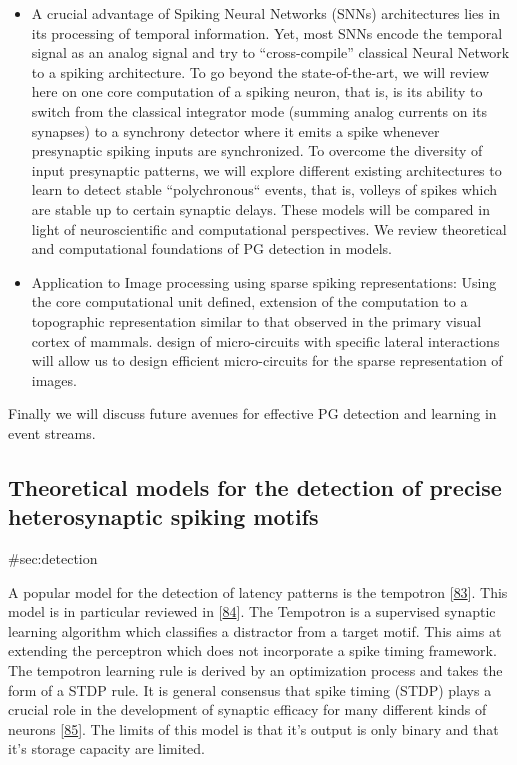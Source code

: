 \begin{itemize}
\item
  A crucial advantage of Spiking Neural Networks (SNNs) architectures lies in its processing of temporal information. Yet, most SNNs encode the temporal signal as an analog signal and try to ``cross-compile'' classical Neural Network to a spiking architecture. To go beyond the state-of-the-art, we will review here on one core computation of a spiking neuron, that is, is its ability to switch from the classical integrator mode (summing analog currents on its synapses) to a synchrony detector where it emits a spike whenever presynaptic spiking inputs are synchronized. To overcome the diversity of input presynaptic patterns, we will explore different existing architectures to learn to detect stable ``polychronous`` events, that is, volleys of spikes which are stable up to certain synaptic delays. These models will be compared in light of neuroscientific and computational perspectives. We review theoretical and computational foundations of PG detection in models.
\item
  Application to Image processing using sparse spiking representations: Using the core computational unit defined, extension of the computation to a topographic representation similar to that observed in the primary visual cortex of mammals. design of micro-circuits with specific lateral interactions will allow us to design efficient micro-circuits for the sparse representation of images.
\end{itemize}

Finally we will discuss future avenues for effective PG detection and learning in event streams.

\hypertarget{theoretical-models-for-the-detection-of-precise-heterosynaptic-spiking-motifs}{%
\subsection{Theoretical models for the detection of precise heterosynaptic spiking motifs}\label{theoretical-models-for-the-detection-of-precise-heterosynaptic-spiking-motifs}}

\#sec:detection

A popular model for the detection of latency patterns is the tempotron {[}\protect\hyperlink{ref-1GazUBEdT}{83}{]}. This model is in particular reviewed in {[}\protect\hyperlink{ref-QCyjy8wE}{84}{]}. The Tempotron is a supervised synaptic learning algorithm which classifies a distractor from a target motif. This aims at extending the perceptron which does not incorporate a spike timing framework. The tempotron learning rule is derived by an optimization process and takes the form of a STDP rule. It is general consensus that spike timing (STDP) plays a crucial role in the development of synaptic efficacy for many different kinds of neurons {[}\protect\hyperlink{ref-EF6Larp8}{85}{]}. The limits of this model is that it's output is only binary and that it's storage capacity are limited.

